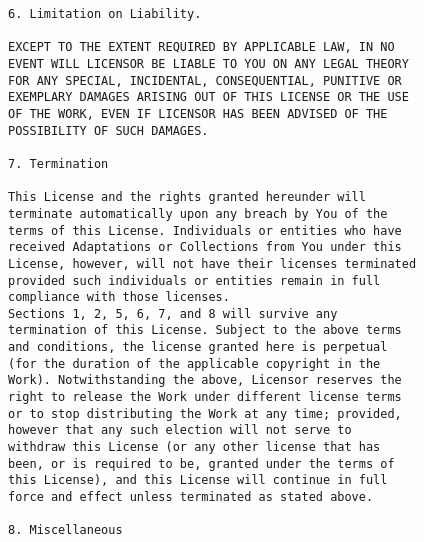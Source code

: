 \begin{verbatim}
6. Limitation on Liability.

EXCEPT TO THE EXTENT REQUIRED BY APPLICABLE LAW, IN NO
EVENT WILL LICENSOR BE LIABLE TO YOU ON ANY LEGAL THEORY
FOR ANY SPECIAL, INCIDENTAL, CONSEQUENTIAL, PUNITIVE OR
EXEMPLARY DAMAGES ARISING OUT OF THIS LICENSE OR THE USE
OF THE WORK, EVEN IF LICENSOR HAS BEEN ADVISED OF THE
POSSIBILITY OF SUCH DAMAGES.

7. Termination

This License and the rights granted hereunder will
terminate automatically upon any breach by You of the
terms of this License. Individuals or entities who have
received Adaptations or Collections from You under this
License, however, will not have their licenses terminated
provided such individuals or entities remain in full
compliance with those licenses.
Sections 1, 2, 5, 6, 7, and 8 will survive any
termination of this License. Subject to the above terms
and conditions, the license granted here is perpetual
(for the duration of the applicable copyright in the
Work). Notwithstanding the above, Licensor reserves the
right to release the Work under different license terms
or to stop distributing the Work at any time; provided,
however that any such election will not serve to
withdraw this License (or any other license that has
been, or is required to be, granted under the terms of
this License), and this License will continue in full
force and effect unless terminated as stated above.

8. Miscellaneous


\end{verbatim}
